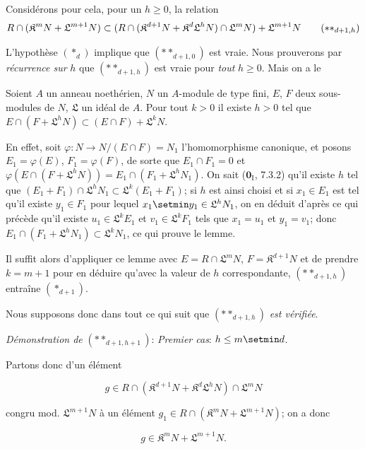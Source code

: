 Considérons pour cela, pour un $h\geq0$, la relation
\begin{equation}
  R\cap(\mathfrak K^mN+\mathfrak L^{m+1}N)\subset(R\cap(\mathfrak K^{d+1}N+\mathfrak K^d\mathfrak L^hN)\cap\mathfrak L^mN)+\mathfrak L^{m+1}N
  \tag{$**_{d+1,h}$}
\end{equation}

L'hypothèse $(*_d)$ implique que $(**_{d+1,0})$ est vraie. Nous prouverons par \emph{récurrence sur} $h$ que $(**_{d+1,h})$ est vraie pour \emph{tout} $h\geq0$. Mais on a le

\begin{lemma}[19.7.1.7]
\label{IV.19.7.1.7}
Soient $A$ un anneau noethérien, $N$ un $A$-module de type fini, $E$, $F$ deux sous-modules de $N$, $\mathfrak L$ un idéal de $A$. Pour tout $k>0$ il existe $h>0$ tel que $E\cap(F+\mathfrak L^hN)\subset(E\cap F)+\mathfrak L^kN$.
\end{lemma}

En effet, soit $\varphi:N\to N/(E\cap F)=N_1$ l'homomorphisme canonique, et posons $E_1=\varphi(E)$, $F_1=\varphi(F)$, de sorte que $E_1\cap F_1=0$ et $\varphi(E\cap(F+\mathfrak L^hN))=E_1\cap(F_1+\mathfrak L^hN_1)$. On sait ($\mathbf{0}_{\mathrm I}$, 7.3.2) qu'il existe $h$ tel que $(E_1+F_1)\cap\mathfrak L^hN_1\subset\mathfrak L^k(E_1+F_1)$; si $h$ est ainsi choisi et si $x_1\in E_1$ est tel qu'il existe $y_1\in F_1$ pour lequel $x_1\setmin y_1\in\mathfrak L^hN_1$, on en déduit d'après ce qui précède qu'il existe $u_1\in\mathfrak L^kE_1$ et $v_1\in\mathfrak L^kF_1$ tels que $x_1=u_1$ et $y_1=v_1$; donc $E_1\cap(F_1+\mathfrak L^hN_1)\subset\mathfrak L^kN_1$, ce qui prouve le lemme.

Il suffit alors d'appliquer ce lemme avec $E=R\cap\mathfrak L^mN$, $F=\mathfrak K^{d+1}N$ et de prendre $k=m+1$ pour en déduire qu'avec la valeur de $h$ correspondante, $(**_{d+1,h})$ entraîne $(*_{d+1})$.

Nous supposons donc dans tout ce qui suit que $(**_{d+1,h})$ \emph{est vérifiée}.

\begin{env}[19.7.1.8]
\label{IV.19.7.1.8}
\emph{Démonstration de} $(**_{d+1,h+1})$: \emph{Premier cas}: $h\leq m\setmin d$.
\end{env}

Partons donc d'un élément
\begin{env}[19.7.1.9]
\label{IV.19.7.1.9}
\[
  g\in R\cap(\mathfrak K^{d+1}N+\mathfrak K^d\mathfrak L^hN)\cap\mathfrak L^mN
\]
\end{env}
congru mod. $\mathfrak L^{m+1}N$ à un élément $g_1\in R\cap(\mathfrak K^mN+\mathfrak L^{m+1}N)$; on a donc
\begin{env}[19.7.1.10]
\label{IV.19.7.1.10}
\[
  g\in\mathfrak K^mN+\mathfrak L^{m+1}N.
\]
\end{env}

